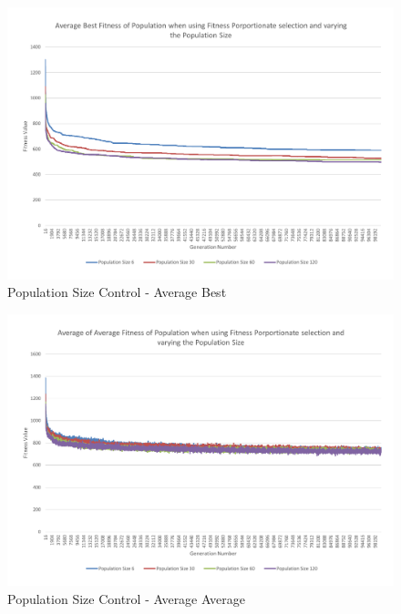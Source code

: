 \begin{figure}[thbp]
	\centerline{\includegraphics[width=\paperwidth]{figures/CircleTests/PopulationSizeControl/CirclePopulationSizeControllAverageBest.pdf}}
	\caption{Population Size Control - Average Best}
	\label{fig:cpscab}
\end{figure}

\begin{figure}[thbp]
	\centerline{\includegraphics[width=\paperwidth]{figures/CircleTests/PopulationSizeControl/CirclePopulationSizeControllAverageAverage.pdf}}
	\caption{Population Size Control - Average Average}
\end{figure}

